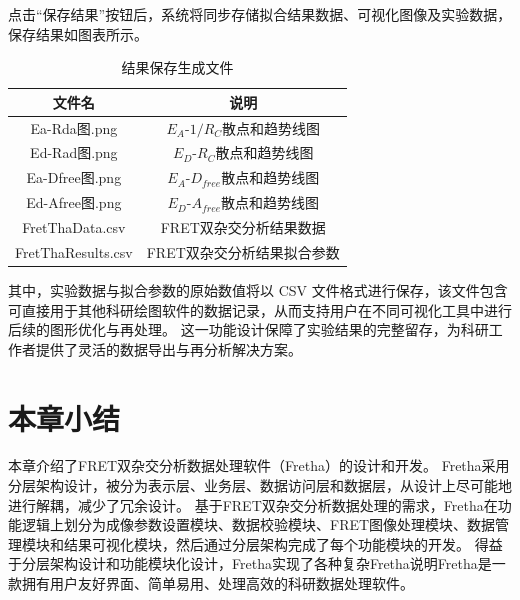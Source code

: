 点击“保存结果”按钮后，系统将同步存储拟合结果数据、可视化图像及实验数据，保存结果如图表所示。
\begin{table}[htbp]
  \centering
  \caption{结果保存生成文件}
  \label{tab:fretha_result_list}
    \begin{tabular}{cc}
      \toprule
      {文件名} & {说明} \\
      \hline
      Ea-Rda图.png & $E_A$-$1/R_C$散点和趋势线图 \\
      Ed-Rad图.png & $E_D$-$R_C$散点和趋势线图 \\
      Ea-Dfree图.png & $E_A$-$D_{free}$散点和趋势线图 \\
      Ed-Afree图.png & $E_D$-$A_{free}$散点和趋势线图 \\
      FretThaData.csv & FRET双杂交分析结果数据 \\
      FretThaResults.csv & FRET双杂交分析结果拟合参数 \\
      \bottomrule
    \end{tabular}
\end{table}
其中，实验数据与拟合参数的原始数值将以 CSV 文件格式进行保存，该文件包含可直接用于其他科研绘图软件的数据记录，从而支持用户在不同可视化工具中进行后续的图形优化与再处理。
这一功能设计保障了实验结果的完整留存，为科研工作者提供了灵活的数据导出与再分析解决方案。
\fi

\section{本章小结}

\ifshowtext
本章介绍了FRET双杂交分析数据处理软件（Fretha）的设计和开发。
Fretha采用分层架构设计，被分为表示层、业务层、数据访问层和数据层，从设计上尽可能地进行解耦，减少了冗余设计。
基于FRET双杂交分析数据处理的需求，Fretha在功能逻辑上划分为成像参数设置模块、数据校验模块、FRET图像处理模块、数据管理模块和结果可视化模块，然后通过分层架构完成了每个功能模块的开发。
得益于分层架构设计和功能模块化设计，Fretha实现了各种复杂Fretha说明Fretha是一款拥有用户友好界面、简单易用、处理高效的科研数据处理软件。
\fi